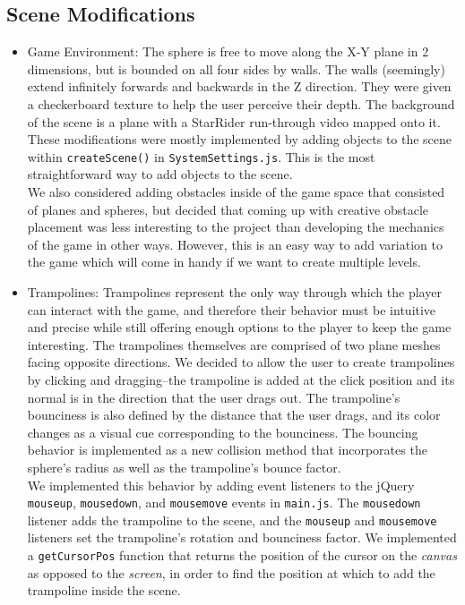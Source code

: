 \documentclass[a4paper]{article}
\begin{document}
\subsection{Scene Modifications}
\begin{itemize}
\item Game Environment: The sphere is free to move along the X-Y plane in 2 dimensions, but is bounded on all four sides by walls. The walls (seemingly) extend infinitely forwards and backwards in the Z direction. They were given a checkerboard texture to help the user perceive their depth. The background of the scene is a plane with a StarRider run-through video mapped onto it. \\
These modifications were mostly implemented by adding objects to the scene within \texttt{createScene()} in \texttt{SystemSettings.js}. This is the most straightforward way to add objects to the scene. \\
We also considered adding obstacles inside of the game space that consisted of planes and spheres, but decided that coming up with creative obstacle placement was less interesting to the project than developing the mechanics of the game in other ways. However, this is an easy way to add variation to the game which will come in handy if we want to create multiple levels.
\item Trampolines: Trampolines represent the only way through which the player can interact with the game, and therefore their behavior must be intuitive and precise while still offering enough options to the player to keep the game interesting. The trampolines themselves are comprised of two plane meshes facing opposite directions. We decided to allow the user to create trampolines by clicking and dragging--the trampoline is added at the click position and its normal is in the direction that the user drags out. The trampoline's bounciness is also defined by the distance that the user drags, and its color changes as a visual cue corresponding to the bounciness. The bouncing behavior is implemented as a new collision method that incorporates the sphere's radius as well as the trampoline's bounce factor.\\
We implemented this behavior by adding event listeners to the jQuery \texttt{mouseup}, \texttt{mousedown}, and \texttt{mousemove} events in \texttt{main.js}. The \texttt{mousedown} listener adds the trampoline to the scene, and the \texttt{mouseup} and \texttt{mousemove} listeners set the trampoline's rotation and bounciness factor. We implemented a \texttt{getCursorPos} function that returns the position of the cursor on the \textit{canvas} as opposed to the \textit{screen}, in order to find the position at which to add the trampoline inside the scene.\\

\end{itemize}
\end{document}
